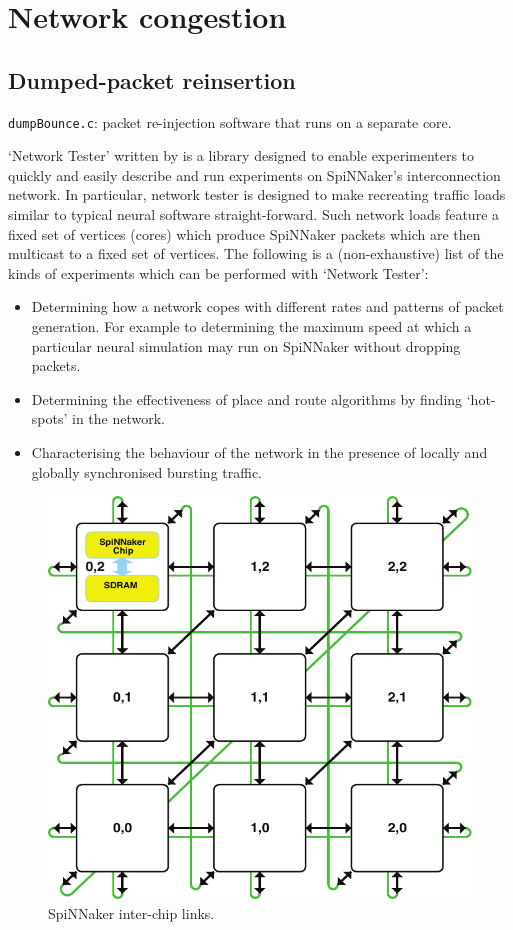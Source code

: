 \documentclass[a4paper, 11pt]{article}
\newlength\drop
\begin{document}
\clearpage
\section{Network congestion}
\label{sec:congestion}

\subsection{Dumped-packet reinsertion}

\verb|dumpBounce.c|:  packet re-injection software that runs on a separate core.
 
`Network Tester' written by \citet{heathcote2015networktester} is a library designed to enable experimenters to quickly and easily describe and run experiments on SpiNNaker's interconnection network. In particular, network tester is designed to make recreating traffic loads similar to typical neural software straight-forward. Such network loads feature a fixed set of vertices (cores) which produce SpiNNaker packets which are then multicast to a fixed set of vertices.
The following is a (non-exhaustive) list of the kinds of experiments which can be performed with `Network Tester':
\begin{itemize}
\item Determining how a network copes with different rates and patterns of packet generation. For example to determining the maximum speed at which a particular neural simulation may run on SpiNNaker without dropping
packets.
\item Determining the effectiveness of place and route algorithms by finding `hot-spots' in the network.
\item Characterising the behaviour of the network in the presence of locally and globally synchronised bursting traffic.
\end{itemize}

\begin{figure}[htbp]
	\centering
	\includegraphics[width=0.4\linewidth]{images/system_architecture.pdf}
	\caption{SpiNNaker inter-chip links.}
	\label{fig:interchip_links}	
\end{figure}
\end{document}
